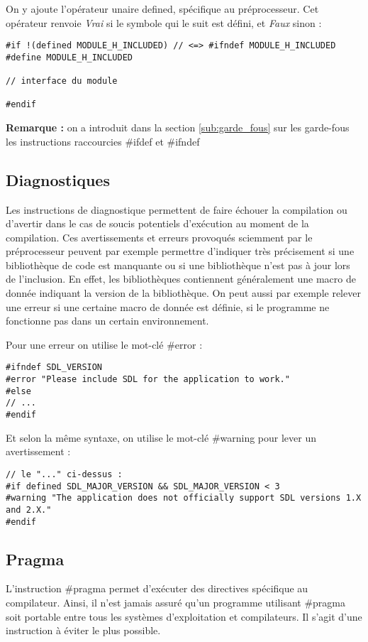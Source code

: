 \documentclass[../../../main.tex]{subfiles}
\begin{document}
On y ajoute l'opérateur unaire \textsf{defined}, spécifique au préprocesseur. Cet opérateur renvoie \textit{Vrai} si le symbole qui le suit est défini, et \textit{Faux} sinon :
\begin{verbatim}
#if !(defined MODULE_H_INCLUDED) // <=> #ifndef MODULE_H_INCLUDED
#define MODULE_H_INCLUDED

// interface du module

#endif
\end{verbatim}
\textbf{Remarque :} on a introduit dans la section \ref{sub:garde_fous} sur les garde-fous les instructions raccourcies \textsf{\#ifdef} et \textsf{\#ifndef}
\subsection{Diagnostiques}\label{sub:Diagnostiques}
Les instructions de diagnostique permettent de faire échouer la compilation ou d'avertir dans le cas de soucis potentiels d'exécution au moment de la compilation. Ces avertissements et erreurs provoqués sciemment par le préprocesseur peuvent par exemple permettre d'indiquer très précisement si une bibliothèque de code est manquante ou si une bibliothèque n'est pas à jour lors de l'inclusion. En effet, les bibliothèques contiennent généralement une macro de donnée indiquant la version de la bibliothèque. On peut aussi par exemple relever une erreur si une certaine macro de donnée est définie, si le programme ne fonctionne pas dans un certain environnement.

Pour une erreur on utilise le mot-clé \textsf{\#error} :
\begin{verbatim}
#ifndef SDL_VERSION
#error "Please include SDL for the application to work."
#else
// ...
#endif
\end{verbatim}
Et selon la même syntaxe, on utilise le mot-clé \textsf{\#warning} pour lever un avertissement :
\begin{verbatim}
// le "..." ci-dessus :
#if defined SDL_MAJOR_VERSION && SDL_MAJOR_VERSION < 3
#warning "The application does not officially support SDL versions 1.X and 2.X."
#endif
\end{verbatim}
\subsection{Pragma} \label{sub:pragma}
L'instruction \textsf{\#pragma} permet d'exécuter des directives spécifique au compilateur. Ainsi, il n'est jamais assuré qu'un programme utilisant \textsf{\#pragma} soit portable entre tous les systèmes d'exploitation et compilateurs. Il s'agit d'une instruction à éviter le plus possible.
\end{document}

